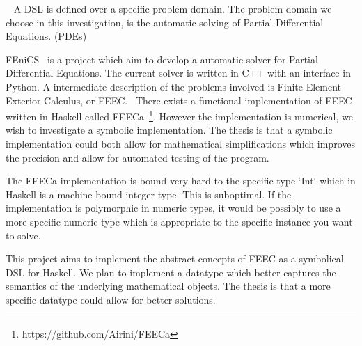 \documentclass{scrartcl}
\begin{document}

~\cite{van2000domain}
A DSL is defined over a specific problem domain. The problem domain we choose
in this investigation, is the automatic solving of Partial Differential
Equations. (PDEs)

FEniCS~\cite{AlnaesBlechta2015a} is a project which aim to develop a automatic
solver for Partial Differential Equations. The current solver is written in C++
with an interface in Python. A intermediate description of the problems
involved is Finite Element Exterior Calculus, or FEEC.~\cite{arnold2006finite}
There exists a functional implementation of FEEC written in Haskell called
FEECa~\footnote{https://github.com/Airini/FEECa}.  However the implementation
is numerical, we wish to investigate a symbolic implementation.  The thesis is
that a symbolic implementation could both allow for mathematical
simplifications which improves the precision and allow for automated testing of
the program.



The FEECa implementation is bound very hard to the specific type `Int` which in
Haskell is a machine-bound integer type. This is suboptimal. If the
implementation is polymorphic in numeric types, it would be possibly to use
a more specific numeric type which is appropriate to the specific instance you
want to solve.



This project aims to implement the abstract concepts of FEEC as a symbolical
DSL for Haskell.  %
We plan to implement a datatype which better captures the semantics of the
underlying mathematical objects.  The thesis is that a more specific datatype
could allow for better solutions.
\end{document}
